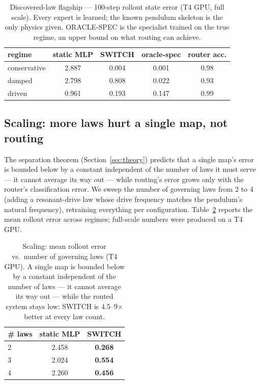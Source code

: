 \documentclass[11pt,a4paper]{article}
\begin{document}
\begin{table}[t]
  \centering
  \caption{Discovered-law flagship --- 100-step rollout state error (T4 GPU,
full scale). Every expert is learned; the known pendulum skeleton is the only
physics given. ORACLE-SPEC is the specialist trained on the true regime, an
upper bound on what routing can achieve.}
  \label{tab:flagship2}
  \begin{tabular}{lcccc}
    \toprule
    regime & static MLP & SWITCH & oracle-spec & router acc. \\
    \midrule
    conservative & 2.887 & 0.004 & 0.001 & 0.98 \\
    damped       & 2.798 & 0.808 & 0.022 & 0.93 \\
    driven       & 0.961 & 0.193 & 0.147 & 0.99 \\
    \bottomrule
  \end{tabular}
\end{table}

\subsection{Scaling: more laws hurt a single map, not routing}
\label{sec:flagship3}

The separation theorem (Section~\ref{sec:theory}) predicts that a single
map's error is bounded below by a constant independent of the number of laws
it must serve --- it cannot average its way out --- while routing's error
grows only with the router's classification error. We sweep the number of
governing laws from 2 to 4 (adding a resonant-drive law whose drive
frequency matches the pendulum's natural frequency), retraining everything
per configuration. Table~\ref{tab:scaling} reports the mean rollout error
across regimes; full-scale numbers were produced on a T4 GPU.

\begin{table}[t]
  \centering
  \caption{Scaling: mean rollout error vs.\ number of governing laws (T4 GPU).
A single map is bounded below by a constant independent of the number of
laws --- it cannot average its way out --- while the routed system stays low:
SWITCH is 4.5--9$\times$ better at every law count.}
  \label{tab:scaling}
  \begin{tabular}{lcc}
    \toprule
    \# laws & static MLP & SWITCH \\
    \midrule
    2 & 2.458 & \textbf{0.268} \\
    3 & 2.024 & \textbf{0.554} \\
    4 & 2.260 & \textbf{0.456} \\
    \bottomrule
  \end{tabular}
\end{table}
\end{document}
